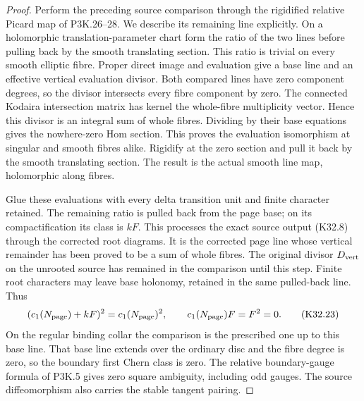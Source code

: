 \begin{proof}
Perform the preceding source comparison through
the rigidified relative Picard map of P3K.26--28.
We describe its remaining line explicitly. On a
holomorphic translation-parameter chart form the
ratio of the two lines before pulling back by the
smooth translating section. This ratio is trivial
on every smooth elliptic fibre. Proper direct image
and evaluation give a base line and an effective
vertical evaluation divisor. Both compared lines
have zero component degrees, so the divisor
intersects every fibre component by zero. The
connected Kodaira intersection matrix has kernel
the whole-fibre multiplicity vector. Hence this
divisor is an integral sum of whole fibres.
Dividing by their base equations gives the
nowhere-zero Hom section. This proves the
evaluation isomorphism at singular and smooth
fibres alike. Rigidify at the zero section and
pull it back by the smooth translating section.
The result is the actual smooth line map,
holomorphic along fibres.

Glue these evaluations with every delta transition
unit and finite character retained. The remaining
ratio is pulled back from the page base; on its
compactification its class is $kF$. This processes
the exact source output (K32.8) through the corrected
root diagrams. It is the corrected page line whose
vertical remainder has been proved to be a sum of
whole fibres. The original divisor $D_{\rm vert}$
on the unrooted source has remained in the
comparison until this step. Finite root characters
may leave base holonomy, retained in the same
pulled-back line. Thus
\[
 (c_1(N_{\rm page})+kF)^2=c_1(N_{\rm page})^2,\qquad
               c_1(N_{\rm page})F=F^2=0.               \tag{K32.23}
\]
On the regular binding collar the comparison is
the prescribed one up to this base line. That
base line extends over the ordinary disc and
the fibre degree is zero, so the boundary first
Chern class is zero. The relative boundary-gauge
formula of P3K.5 gives zero square ambiguity,
including odd gauges. The source diffeomorphism
also carries the stable tangent pairing.


\end{proof}
